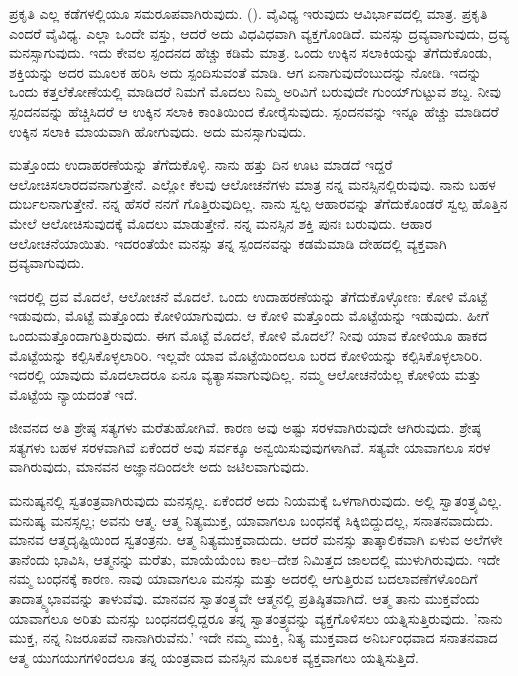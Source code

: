 ಪ್ರಕೃತಿ ಎಲ್ಲ ಕಡೆಗಳಲ್ಲಿಯೂ ಸಮರೂಪವಾಗಿರುವುದು. (). ವೈವಿಧ್ಯ ಇರುವುದು ಆವಿರ್ಭಾವದಲ್ಲಿ ಮಾತ್ರ. ಪ್ರಕೃತಿ ಎಂದರೆ ವೈವಿಧ್ಯ. ಎಲ್ಲಾ ಒಂದೇ ವಸ್ತು, ಆದರೆ ಅದು ವಿಧವಿಧವಾಗಿ ವ್ಯಕ್ತಗೊಂಡಿದೆ. ಮನಸ್ಸು ದ್ರವ್ಯವಾಗುವುದು, ದ್ರವ್ಯ ಮನಸ್ಸಾಗುವುದು. ಇದು ಕೇವಲ ಸ್ಪಂದನದ ಹೆಚ್ಚು ಕಡಿಮೆ ಮಾತ್ರ. ಒಂದು ಉಕ್ಕಿನ ಸಲಾಕಿಯನ್ನು ತೆಗೆದುಕೊಂಡು, ಶಕ್ತಿಯನ್ನು ಅದರ ಮೂಲಕ ಹರಿಸಿ ಅದು ಸ್ಪಂದಿಸುವಂತೆ ಮಾಡಿ. ಆಗ ಏನಾಗುವುದೆಂಬುದನ್ನು ನೋಡಿ. ಇದನ್ನು ಒಂದು ಕತ್ತಲೆಕೋಣೆಯಲ್ಲಿ ಮಾಡಿದರೆ ನಿಮಗೆ ಮೊದಲು ನಿಮ್ಮ ಅರಿವಿಗೆ ಬರುವುದೇ ಗುಂಯ್‌ಗುಟ್ಟುವ ಶಬ್ದ. ನೀವು ಸ್ಪಂದನವನ್ನು ಹೆಚ್ಚಿಸಿದರೆ ಆ ಉಕ್ಕಿನ ಸಲಾಕಿ ಕಾಂತಿಯಿಂದ ಕೋರೈಸುವುದು. ಸ್ಪಂದನವನ್ನು ಇನ್ನೂ ಹೆಚ್ಚು ಮಾಡಿದರೆ ಉಕ್ಕಿನ ಸಲಾಕಿ ಮಾಯವಾಗಿ ಹೋಗುವುದು. ಅದು ಮನಸ್ಸಾಗುವುದು.

ಮತ್ತೊಂದು ಉದಾಹರಣೆಯನ್ನು ತೆಗೆದುಕೊಳ್ಳಿ. ನಾನು ಹತ್ತು ದಿನ ಊಟ ಮಾಡದೆ ಇದ್ದರೆ ಆಲೋಚಿಸಲಾರದವನಾಗುತ್ತೇನೆ. ಎಲ್ಲೋ ಕೆಲವು ಆಲೋಚನೆಗಳು ಮಾತ್ರ ನನ್ನ ಮನಸ್ಸಿನಲ್ಲಿರುವುವು. ನಾನು ಬಹಳ ದುರ್ಬಲನಾಗುತ್ತೇನೆ. ನನ್ನ ಹೆಸರೆ ನನಗೆ ಗೊತ್ತಿರುವುದಿಲ್ಲ. ನಾನು ಸ್ವಲ್ಪ ಆಹಾರವನ್ನು ತೆಗೆದುಕೊಂಡರೆ ಸ್ವಲ್ಪ ಹೊತ್ತಿನ ಮೇಲೆ ಆಲೋಚಿಸುವುದಕ್ಕೆ ಮೊದಲು ಮಾಡುತ್ತೇನೆ. ನನ್ನ ಮನಸ್ಸಿನ ಶಕ್ತಿ ಪುನಃ ಬರುವುದು. ಆಹಾರ ಆಲೋಚನೆಯಾಯಿತು. ಇದರಂತೆಯೇ ಮನಸ್ಸು ತನ್ನ ಸ್ಪಂದನವನ್ನು ಕಡಮೆಮಾಡಿ ದೇಹದಲ್ಲಿ ವ್ಯಕ್ತವಾಗಿ ದ್ರವ್ಯವಾಗುವುದು.

ಇದರಲ್ಲಿ ದ್ರವ ಮೊದಲೆ, ಆಲೋಚನೆ ಮೊದಲೆ. ಒಂದು ಉದಾಹರಣೆಯನ್ನು ತೆಗೆದುಕೊಳ್ಳೋಣ: ಕೋಳಿ ಮೊಟ್ಟೆ ಇಡುವುದು, ಮೊಟ್ಟೆ ಮತ್ತೊಂದು ಕೋಳಿಯಾಗುವುದು. ಆ ಕೋಳಿ ಮತ್ತೊಂದು ಮೊಟ್ಟೆಯನ್ನು ಇಡುವುದು. ಹೀಗೆ ಒಂದು\break ಮತ್ತೊಂದಾಗುತ್ತಿರುವುದು. ಈಗ ಮೊಟ್ಟೆ ಮೊದಲೆ, ಕೋಳಿ ಮೊದಲೆ? ನೀವು ಯಾವ ಕೋಳಿಯೂ ಹಾಕದ ಮೊಟ್ಟೆಯನ್ನು ಕಲ್ಪಿಸಿಕೊಳ್ಳಲಾರಿರಿ. ಇಲ್ಲವೇ ಯಾವ ಮೊಟ್ಟೆಯಿಂದಲೂ ಬರದ ಕೋಳಿಯನ್ನು ಕಲ್ಪಿಸಿಕೊಳ್ಳಲಾರಿರಿ. ಇದರಲ್ಲಿ ಯಾವುದು ಮೊದಲಾದರೂ ಏನೂ ವ್ಯತ್ಯಾಸವಾಗುವುದಿಲ್ಲ. ನಮ್ಮ ಆಲೋಚನೆಯೆಲ್ಲ ಕೋಳಿಯ ಮತ್ತು ಮೊಟ್ಟೆಯ ನ್ಯಾಯದಂತೆ ಇದೆ.

ಜೀವನದ ಅತಿ ಶ್ರೇಷ್ಠ ಸತ್ಯಗಳು ಮರೆತುಹೋಗಿವೆ. ಕಾರಣ ಅವು ಅಷ್ಟು ಸರಳವಾಗಿರುವುದೇ ಆಗಿರುವುದು. ಶ್ರೇಷ್ಠ ಸತ್ಯಗಳು ಬಹಳ ಸರಳವಾಗಿವೆ ಏಕೆಂದರೆ ಅವು ಸರ್ವಕ್ಕೂ ಅನ್ವಯಿಸುವುವುಗಳಾಗಿವೆ. ಸತ್ಯವೇ ಯಾವಾಗಲೂ ಸರಳ ವಾಗಿರುವುದು, ಮಾನವನ ಅಜ್ಞಾನದಿಂದಲೇ ಅದು ಜಟಿಲವಾಗುವುದು.

ಮನುಷ್ಯನಲ್ಲಿ ಸ್ವತಂತ್ರವಾಗಿರುವುದು ಮನಸ್ಸಲ್ಲ. ಏಕೆಂದರೆ ಅದು ನಿಯಮಕ್ಕೆ ಒಳಗಾಗಿರುವುದು. ಅಲ್ಲಿ ಸ್ವಾತಂತ್ರ್ಯವಿಲ್ಲ. ಮನುಷ್ಯ ಮನಸ್ಸಲ್ಲ; ಅವನು ಆತ್ಮ. ಆತ್ಮ ನಿತ್ಯಮುಕ್ತ, ಯಾವಾಗಲೂ ಬಂಧನಕ್ಕೆ ಸಿಕ್ಕಿಬಿದ್ದುದಲ್ಲ, ಸನಾತನವಾದುದು. ಮಾನವ ಆತ್ಮದೃಷ್ಟಿಯಿಂದ ಸ್ವತಂತ್ರನು. ಆತ್ಮ ನಿತ್ಯಮುಕ್ತವಾದುದು. ಆದರೆ ಮನಸ್ಸು ತಾತ್ಕಾಲಿಕವಾಗಿ ಏಳುವ ಅಲೆಗಳೇ ತಾನೆಂದು ಭಾವಿಸಿ, ಆತ್ಮನನ್ನು ಮರೆತು, ಮಾಯೆಯೆಂಬ ಕಾಲ–ದೇಶ ನಿಮಿತ್ತದ ಜಾಲದಲ್ಲಿ ಮುಳುಗಿರುವುದು. ಇದೇ ನಮ್ಮ ಬಂಧನಕ್ಕೆ ಕಾರಣ. ನಾವು ಯಾವಾಗಲೂ ಮನಸ್ಸು ಮತ್ತು ಅದರಲ್ಲಿ ಆಗುತ್ತಿರುವ ಬದಲಾವಣೆಗಳೊಂದಿಗೆ ತಾದಾತ್ಮ್ಯಭಾವವನ್ನು ತಾಳುವೆವು. ಮಾನವನ ಸ್ವಾತಂತ್ರ್ಯವೇ ಆತ್ಮನಲ್ಲಿ ಪ್ರತಿಷ್ಠಿತವಾಗಿದೆ. ಆತ್ಮ ತಾನು ಮುಕ್ತವೆಂದು ಯಾವಾಗಲೂ ಅರಿತು ಮನಸ್ಸು ಬಂಧನದಲ್ಲಿದ್ದರೂ ತನ್ನ ಸ್ವಾತಂತ್ರ್ಯವನ್ನು ವ್ಯಕ್ತಗೊಳಿಸಲು ಯತ್ನಿಸುತ್ತಿರುವುದು. 'ನಾನು ಮುಕ್ತ, ನನ್ನ ನಿಜರೂಪವೆ ನಾನಾಗಿರುವೆನು.' ಇದೇ ನಮ್ಮ ಮುಕ್ತಿ, ನಿತ್ಯ ಮುಕ್ತವಾದ ಅನಿರ್ಬಂಧವಾದ ಸನಾತನವಾದ ಆತ್ಮ ಯುಗಯುಗಗಳಿಂದಲೂ ತನ್ನ ಯಂತ್ರವಾದ ಮನಸ್ಸಿನ ಮೂಲಕ ವ್ಯಕ್ತವಾಗಲು ಯತ್ನಿಸುತ್ತಿದೆ.


